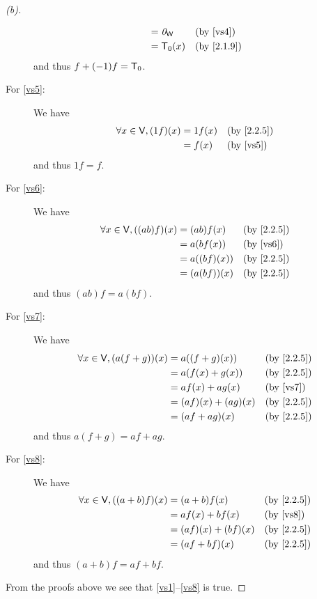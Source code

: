 \begin{proof}[(b)]
\begin{description}
\begin{align*}
				                                   & = \zv_{\W}          &  & \text{(by \ref{vs4})} \\
				                                   & = \zT(x)            &  & \by{2.1.9}
			\end{align*}
			and thus \(f + (-1)f = \mathsf{T}_0\).
		\item[For \ref{vs5}:] We have
			\begin{align*}
				\forall x \in \V, (1f)(x) & = 1f(x) &  & \by{2.2.5}            \\
				                          & = f(x)  &  & \text{(by \ref{vs5})}
			\end{align*}
			and thus \(1f = f\).
		\item[For \ref{vs6}:] We have
			\begin{align*}
				\forall x \in \V, ((ab)f)(x) & = (ab) f(x)   &  & \by{2.2.5}            \\
				                             & = a (bf(x))   &  & \text{(by \ref{vs6})} \\
				                             & = a ((bf)(x)) &  & \by{2.2.5}            \\
				                             & = (a (bf))(x) &  & \by{2.2.5}
			\end{align*}
			and thus \((ab)f = a (bf)\).
		\item[For \ref{vs7}:] We have
			\begin{align*}
				\forall x \in \V, (a(f + g))(x) & = a((f + g)(x))     &  & \by{2.2.5}            \\
				                                & = a(f(x) + g(x))    &  & \by{2.2.5}            \\
				                                & = af(x) + ag(x)     &  & \text{(by \ref{vs7})} \\
				                                & = (af)(x) + (ag)(x) &  & \by{2.2.5}            \\
				                                & = (af + ag)(x)      &  & \by{2.2.5}
			\end{align*}
			and thus \(a(f + g) = af + ag\).
		\item[For \ref{vs8}:] We have
			\begin{align*}
				\forall x \in \V, ((a + b)f)(x) & = (a + b) f(x)      &  & \by{2.2.5}            \\
				                                & = af(x) + bf(x)     &  & \text{(by \ref{vs8})} \\
				                                & = (af)(x) + (bf)(x) &  & \by{2.2.5}            \\
				                                & = (af + bf)(x)      &  & \by{2.2.5}
			\end{align*}
			and thus \((a + b)f = af + bf\).
	\end{description}
	From the proofs above we see that \ref{vs1}--\ref{vs8} is true.


\end{proof}

